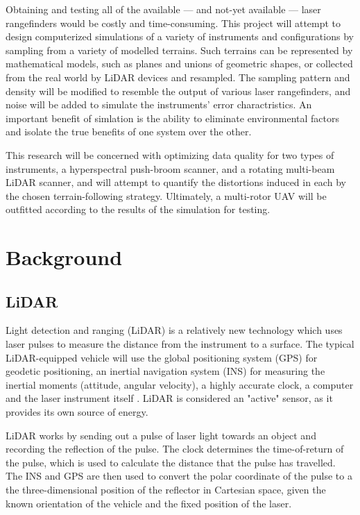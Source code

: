 \documentclass[10pt,a4paper]{report}
\begin{document}
Obtaining and testing all of the available --- and not-yet available --- laser rangefinders would be costly and time-consuming. This project will attempt to design computerized simulations of a variety of instruments and configurations by sampling from a variety of modelled terrains. Such terrains can be represented by mathematical models, such as planes and unions of geometric shapes, or collected from the real world by LiDAR devices and resampled. The sampling pattern and density will be modified to resemble the output of various laser rangefinders, and noise will be added to simulate the instruments' error charactristics. An important benefit of simlation is the ability to eliminate environmental factors and isolate the true benefits of one system over the other.

This research will be concerned with optimizing data quality for two types of instruments, a hyperspectral push-broom scanner, and a rotating multi-beam LiDAR scanner, and will attempt to quantify the distortions induced in each by the chosen terrain-following strategy. Ultimately, a multi-rotor UAV will be outfitted according to the results of the simulation for testing.

\section{Background}

\subsection{LiDAR}

Light detection and ranging (LiDAR) is a relatively new technology which uses laser pulses to measure the distance from the instrument to a surface. The typical LiDAR-equipped vehicle will use the global positioning system (GPS) for geodetic positioning, an inertial navigation system (INS) for measuring the inertial moments (attitude, angular velocity), a highly accurate clock, a computer and the laser instrument itself \cite{May2007,Lillesand1999}. LiDAR is considered an "active" sensor, as it provides its own source of energy.

LiDAR works by sending out a pulse of laser light towards an object and recording the reflection of the pulse. The clock determines the time-of-return of the pulse, which is used to calculate the distance that the pulse has travelled. The INS and GPS are then used to convert the polar coordinate of the pulse to a the three-dimensional position of the reflector in Cartesian space, given the known orientation of the vehicle and the fixed position of the laser. 
\end{document}
